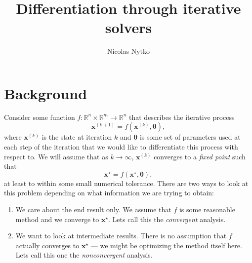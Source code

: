 \documentclass{article}
\renewcommand{\vec}[1]{\bm{{#1}}}
\theoremstyle{definition}
\begin{document}
\title{Differentiation through iterative solvers}
\author{Nicolas Nytko}
\maketitle

\section{Background}
Consider some function $f : \mathbb{R}^n \times \mathbb{R}^m \to \mathbb{R}^n$ that describes the iterative process
\begin{equation}
  \vec{x}^{(k+1)} = f\left(\vec{x}^{(k)}, \vec{\theta}\right),
\end{equation}
where $\vec{x}^{(k)}$ is the state at iteration $k$ and $\vec{\theta}$ is some set of parameters used at each step of the iteration that we would like to differentiate this process with respect to.  We will assume that as $k \to \infty$, $\vec{x}^{(k)}$ converges to a \textit{fixed point} such that
\begin{equation}
  \vec{x}^{\star} = f\left(\vec{x}^{\star}, \vec{\theta}\right),
\end{equation}
at least to within some small numerical tolerance.  There are two ways to look at this problem depending on what information we are trying to obtain:
\begin{enumerate}
\item We care about the end result only.  We assume that $f$ is some reasonable method and we converge to $\vec{x}^{\star}$.  Lets call this the \textit{convergent} analysis.
\item We want to look at intermediate results.  There is no assumption that $f$ actually converges to $\vec{x}^{\star}$ --- we might be optimizing the method itself here.  Lets call this one the \textit{nonconvergent} analysis.
\end{enumerate}
\end{document}

